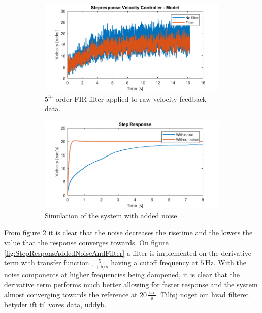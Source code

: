 \documentclass[../../main.tex]{subfiles}
\begin{document}
\begin{figure}[H]
     \centering
     \begin{subfigure}[b]{0.49\textwidth}
         \centering
    \includegraphics[width=\textwidth]{Sections/Miscellaneous/Images/FilteredStepRespons5Order.png}
    \caption{$5^{th}$ order FIR filter applied to raw velocity feedback data.}
    \label{fig:FilteredStepRespons5Order}
     \end{subfigure}
     \hfill
     \begin{subfigure}[b]{0.49\textwidth}
         \centering
         \includegraphics[width=\textwidth]{Sections/Miscellaneous/Images/StepresponsAddedNoise.png}
         \caption{Simulation of the system with added noise.}
         \label{fig:StepResponsAddedNoise}
     \end{subfigure}
        \caption{}
        \label{fig:FilterDiskussionImplementedFilter}
\end{figure}
From figure \ref{fig:StepResponsAddedNoise} it is clear that the noise decreases the risetime and the lowers the value that the response converges towards. On figure \ref{fig:StepResponsAddedNoiseAndFilter} a filter is implemented on the derivative term with transfer function $\frac{5}{1+5/s}$ having a cutoff frequency at $5\,\mathrm{Hz}$. With the noise components at higher frequencies being dampened, it is clear that the derivative term performs much better allowing for faster response and the system almost converging towards the reference at $20\,\frac{\mathrm{rad}}{\mathrm{s}}$. Tilføj noget om hvad filteret betyder ift til vores data, uddyb.\\
\end{document}
